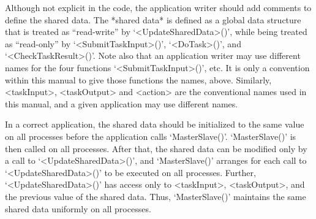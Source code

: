 \endtt

Although not explicit in the code,  the  application  writer  should  add
comments to define the shared data. The *shared data*  is  defined  as  a
global  data   structure   that   is   treated   as   ``read-write''   by
`<UpdateSharedData>()',  while  being   treated   as   ``read-only''   by
`<SubmitTaskInput>()', `<DoTask>()', and `<CheckTaskResult>()'. Note also
that an application writer may use different names for the four functions
`<SubmitTaskInput>()', etc. It is only a convention within this manual to
give  those  functions  the   names,   above.   Similarly,   <taskInput>,
<taskOutput> and <action> are the conventional names used in this manual,
and a given application may use different names.

In a correct {\ParGAP} application, the shared data should be initialized
to  the  same  value  on  all  processes  before  the  application  calls
`MasterSlave()'. `MasterSlave()' is then called on all  processes.  After
that,  the  shared data   can   be   modified   only   by   a   call   to
`<UpdateSharedData>()', and `MasterSlave()' arranges  for  each  call  to
`<UpdateSharedData>()'  to  be  executed  on  all   processes.   Further,
`<UpdateSharedData>()' has access only to <taskInput>, <taskOutput>,  and
the previous value of the shared data.  Thus,  `MasterSlave()'  maintains
the same shared data uniformly on all processes.

